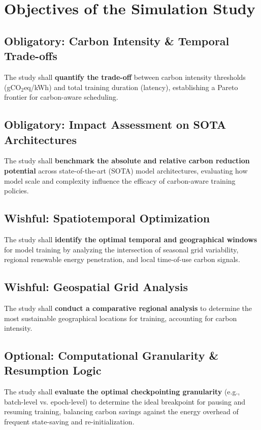 \section{Objectives of the Simulation Study}

\subsection{Obligatory: Carbon Intensity \& Temporal Trade-offs}

The study shall \textbf{quantify the trade-off} between carbon intensity thresholds (gCO$_2$eq/kWh) and total training duration (latency), establishing a Pareto frontier for carbon-aware scheduling.

\subsection{Obligatory: Impact Assessment on SOTA Architectures}

The study shall \textbf{benchmark the absolute and relative carbon reduction potential} across state-of-the-art (SOTA) model architectures, evaluating how model scale and complexity influence the efficacy of carbon-aware training policies.

\subsection{Wishful: Spatiotemporal Optimization}

The study shall \textbf{identify the optimal temporal and geographical windows} for model training by analyzing the intersection of seasonal grid variability, regional renewable energy penetration, and local time-of-use carbon signals.

\subsection{Wishful: Geospatial Grid Analysis}

The study shall \textbf{conduct a comparative regional analysis} to determine the most sustainable geographical locations for training, accounting for carbon intensity.

\subsection{Optional: Computational Granularity \& Resumption Logic}

The study shall \textbf{evaluate the optimal checkpointing granularity} (e.g., batch-level vs. epoch-level) to determine the ideal breakpoint for pausing and resuming training, balancing carbon savings against the energy overhead of frequent state-saving and re-initialization.


